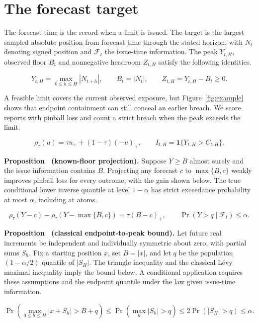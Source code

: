 \documentclass{rQUF2e}
\newcounter{proposition}
\begin{document}
\FloatBarrier

\section{The forecast target}\label{sec:target}

The forecast time is the record when a limit is issued. The target is the largest sampled absolute position from forecast time through the stated horizon, with \(N_t\) denoting signed position and \(\mathcal F_t\) the issue-time information. The peak \(Y_{t,H}\), observed floor \(B_t\) and nonnegative headroom \(Z_{t,H}\) satisfy the following identities.


\[
Y_{t,H}=\max_{0\le h\le H}|N_{t+h}|,\qquad B_t=|N_t|,\qquad Z_{t,H}=Y_{t,H}-B_t\ge0.
\]

A feasible limit covers the current observed exposure, but Figure~\ref{fig:example} shows that endpoint containment can still conceal an earlier breach. We score reports with pinball loss and count a strict breach when the peak exceeds the limit.


\[
\rho_\tau(u)=\tau u_+ +(1-\tau)(-u)_+,\qquad I_{t,H}=\mathbf 1\{Y_{t,H}>C_{t,H}\}.
\]

\noindent\textbf{Proposition~\theproposition{} (known-floor projection).}\label{prop:floor} Suppose \(Y\ge B\) almost surely and the issue information contains \(B\). Projecting any forecast \(c\) to \(\max\{B,c\}\) weakly improves pinball loss for every outcome, with the gain shown below. The true conditional lower inverse quantile at level \(1-\alpha\) has strict exceedance probability at most \(\alpha\), including at atoms.


\[
\rho_\tau(Y-c)-\rho_\tau(Y-\max\{B,c\})=\tau(B-c)_+,\qquad \Pr(Y>q\mid\mathcal F_t)\le\alpha.
\]

\noindent\textbf{Proposition~\theproposition{} (classical endpoint-to-peak bound).}\label{prop:levy} Let future real increments be independent and individually symmetric about zero, with partial sums \(S_h\). Fix a starting position \(x\), set \(B=|x|\), and let \(q\) be the population \((1-\alpha/2)\) quantile of \(|S_H|\). The triangle inequality and the classical L\'evy maximal inequality imply the bound below. A conditional application requires these assumptions and the endpoint quantile under the law given issue-time information.


\[
\Pr\!\left(\max_{0\le h\le H}|x+S_h|>B+q\right)\le\Pr\!\left(\max_h|S_h|>q\right)\le2\Pr(|S_H|>q)\le\alpha.
\]
\end{document}
